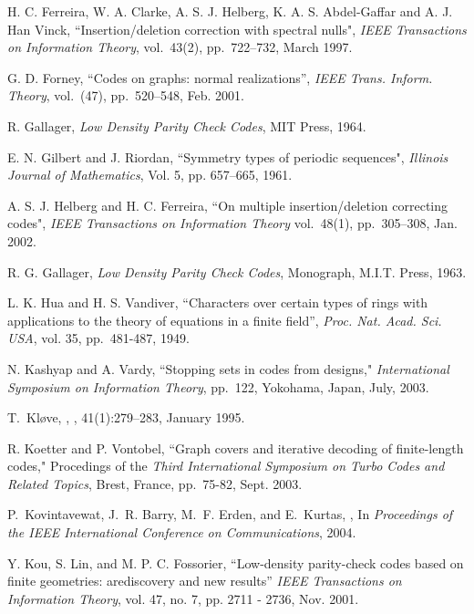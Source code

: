 \begin{thebibliography}{10}
H. C. Ferreira, W. A. Clarke, A. S. J. Helberg, K. A. S.
Abdel-Gaffar and A. J. Han Vinck, ``Insertion/deletion correction
with spectral nulls", \emph{IEEE Transactions on Information
Theory}, vol.\ 43(2), pp.~722--732, March 1997.

G. D. Forney, ``Codes on graphs: normal realizations'', \emph{IEEE
Trans. Inform. Theory}, vol.\ (47), pp.~520--548, Feb. 2001.

R. Gallager, \emph{Low Density Parity Check Codes}, MIT Press, 1964.

E. N. Gilbert and J. Riordan, ``Symmetry types of periodic
sequences", \emph{Illinois Journal of Mathematics}, Vol. 5, pp.
657--665, 1961.


A. S. J. Helberg and H. C. Ferreira, ``On multiple
insertion/deletion correcting codes", \emph{IEEE Transactions on
Information Theory} vol.\ 48(1), pp.~305--308, Jan. 2002.

R. G. Gallager, \emph{Low Density Parity Check Codes}, Monograph,
M.I.T. Press, 1963.

L. K. Hua and H. S. Vandiver, ``Characters over certain types of
rings with applications to the theory of equations in a finite
field'', \emph{Proc. Nat. Acad. Sci. USA}, vol. 35, pp.~481-487,
1949.

N. Kashyap and A. Vardy, ``Stopping sets in codes from designs,"
\emph{International Symposium on Information Theory}, pp.~122,
Yokohama, Japan, July, 2003.

T.~Kl{\o}ve,
,
, 41(1):279--283, January 1995.


R. Koetter and P. Vontobel, ``Graph covers and iterative decoding of
finite-length codes," Procedings of the \emph{Third International
Symposium on Turbo Codes and Related Topics}, Brest, France,
pp.~75-82, Sept. 2003.

P.~Kovintavewat, J.~R. Barry, M.~F. Erden, and E.~Kurtas,
,
\newblock In {\em {Proceedings of the IEEE International Conference on
  Communications}}, 2004.

Y. Kou, S. Lin, and M. P. C. Fossorier, ``Low-density parity-check
codes based on finite geometries: arediscovery and new results''
\emph{IEEE Transactions on Information Theory}, vol. 47, no. 7,  pp.
2711 - 2736, Nov. 2001.



\end{thebibliography}
